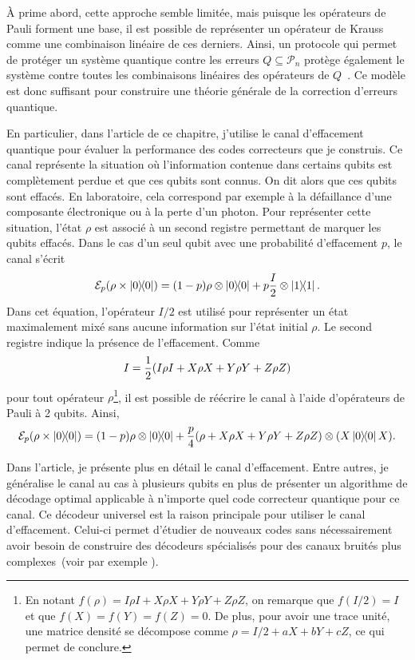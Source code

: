 À prime abord,
cette approche semble limitée,
mais puisque les opérateurs de Pauli forment une base,
il est possible de représenter un opérateur de Krauss
comme une combinaison linéaire de ces derniers.
Ainsi,
un protocole qui permet de protéger un système quantique contre les erreurs 
$Q \subseteq \mathcal P_n$ protège également le système contre toutes les 
combinaisons linéaires des opérateurs de $Q$~\cite{knill_theory_1997}.
Ce modèle est donc suffisant pour construire une théorie générale de la correction d'erreurs quantique.

En particulier,
dans l'article de ce chapitre,
j'utilise le canal d'effacement quantique pour évaluer la performance
des codes correcteurs que je construis.
Ce canal représente la situation où l'information contenue dans certains 
qubits est complètement perdue et que ces qubits sont connus.
On dit alors que ces qubits sont effacés.
En laboratoire, cela correspond par exemple à la défaillance d'une composante électronique
ou à la perte d'un photon.
Pour représenter cette situation, l'état $\rho$ est associé à un second registre
permettant de marquer les qubits effacés.
Dans le cas d'un seul qubit avec une probabilité d'effacement $p$,
le canal s'écrit
\begin{equation}
  \mathcal E_p(\rho \times \op{0}) 
  = (1 - p) \rho \otimes \op{0} + p \frac{I}{2} \otimes \op{1}.
\end{equation}
Dans cet équation,
l'opérateur $I/2$ est utilisé pour représenter un état maximalement mixé
sans aucune information sur l'état initial $\rho$.
Le second registre indique la présence de l'effacement.
Comme 
\begin{align}
  I = \frac{1}{2} \qty(
  I\rho I + X \rho X + Y \rho Y + Z \rho Z
)
\end{align}
pour tout opérateur $\rho$\footnote{
  En notant $f(\rho) = I\rho I + X\rho X + Y \rho Y + Z \rho Z$,
  on remarque que $f(I/2) = I$ et que $f(X) = f(Y) = f(Z) = 0$.
  De plus,
  pour avoir une trace unité,
  une matrice densité se décompose comme $\rho = I/2 + aX + bY + cZ$,
  ce qui permet de conclure.
},
il est possible de réécrire le canal à l'aide d'opérateurs de Pauli à 2 qubits.
Ainsi,
\begin{equation}
  \mathcal E_p(\rho \times \op{0}) 
  = \qty(1 -  p) \rho \otimes \op{0} + \frac{p}{4} \qty(\rho + X \rho X + Y \rho Y + Z \rho Z)\otimes \qty(X\op{0}X).
\end{equation}

Dans l'article,
je présente plus en détail le canal d'effacement.
Entre autres,
je généralise le canal au cas à plusieurs qubits
en plus de présenter un algorithme de décodage optimal applicable à n'importe quel
code correcteur quantique pour ce canal.
Ce décodeur universel est la raison principale pour utiliser le canal d'effacement.
Celui-ci permet d'étudier de nouveaux codes sans nécessairement avoir besoin de construire des 
décodeurs spécialisés pour des canaux bruités plus complexes~(voir par exemple \cite{pastawski_holographic_2015, gullans_quantum_2021}).


